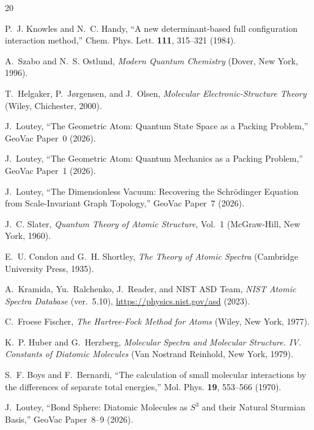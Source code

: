 \documentclass[aps,pra,twocolumn,superscriptaddress,longbibliography,floatfix]{revtex4-2}
\begin{document}
\begin{thebibliography}{20}

P.~J. Knowles and N.~C. Handy,
``A new determinant-based full configuration interaction method,''
Chem. Phys. Lett. \textbf{111}, 315--321 (1984).

A.~Szabo and N.~S. Ostlund,
\textit{Modern Quantum Chemistry}
(Dover, New York, 1996).

T.~Helgaker, P.~J\o rgensen, and J.~Olsen,
\textit{Molecular Electronic-Structure Theory}
(Wiley, Chichester, 2000).

J.~Loutey,
``The Geometric Atom: Quantum State Space as a Packing Problem,''
GeoVac Paper~0 (2026).

J.~Loutey,
``The Geometric Atom: Quantum Mechanics as a Packing Problem,''
GeoVac Paper~1 (2026).

J.~Loutey,
``The Dimensionless Vacuum: Recovering the Schr\"odinger Equation
from Scale-Invariant Graph Topology,''
GeoVac Paper~7 (2026).

J.~C. Slater,
\textit{Quantum Theory of Atomic Structure}, Vol.~1
(McGraw-Hill, New York, 1960).

E.~U. Condon and G.~H. Shortley,
\textit{The Theory of Atomic Spectra}
(Cambridge University Press, 1935).

A.~Kramida, Yu.~Ralchenko, J.~Reader, and NIST ASD Team,
\textit{NIST Atomic Spectra Database} (ver.~5.10),
\url{https://physics.nist.gov/asd} (2023).

C.~Froese Fischer,
\textit{The Hartree-Fock Method for Atoms}
(Wiley, New York, 1977).

K.~P. Huber and G.~Herzberg,
\textit{Molecular Spectra and Molecular Structure. IV. Constants
of Diatomic Molecules}
(Van Nostrand Reinhold, New York, 1979).

S.~F. Boys and F.~Bernardi,
``The calculation of small molecular interactions by the differences
of separate total energies,''
Mol. Phys. \textbf{19}, 553--566 (1970).

J.~Loutey,
``Bond Sphere: Diatomic Molecules as $S^3$ and their Natural
Sturmian Basis,''
GeoVac Paper~8--9 (2026).

\end{thebibliography}
\end{document}
